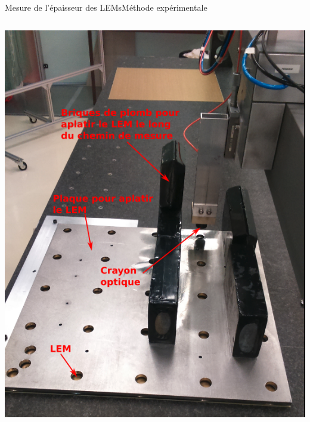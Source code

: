 \begin{frame}{Mesure de l'épaisseur des LEMs}{Méthode expérimentale}
\begin{scriptsize}
\begin{columns}
\begin{column}{0.5\textwidth}
    				\centering \includegraphics[height=0.6\textheight]{./pictures/plate_and_bricks.png}\\
    			\end{column}
    		\end{columns}
    	\end{scriptsize}
    \end{frame}

